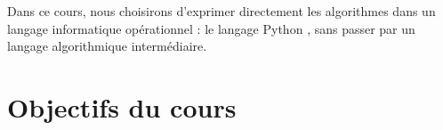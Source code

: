 Dans ce cours, nous choisirons d'exprimer directement les algorithmes dans un 
langage informatique opérationnel : le langage {\sc Python} \cite{swinnen}\label{cite:swinnen}, sans passer par un
langage algorithmique intermédiaire.


\section{Objectifs du cours}
%
%


